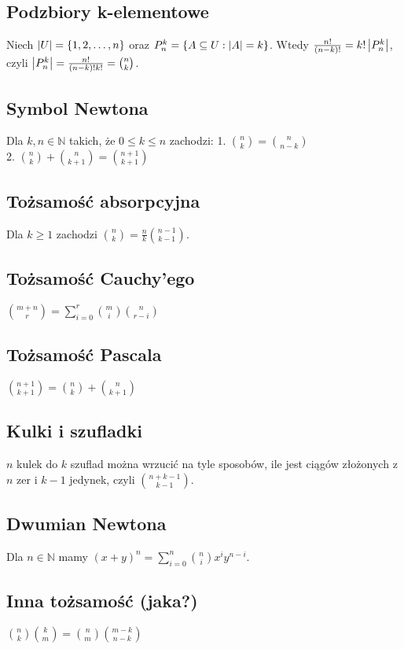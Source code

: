 \subsection*{Podzbiory k-elementowe}
Niech $\left| U \right| = \{ 1, 2, \ldots, n \}$ oraz $P_n^k = {\{ A \subseteq U : \left| A \right| = k \}}$.
Wtedy ${\frac{n!}{(n - k)!}} = {k! \left| P_n^k \right|}$, czyli 
$\left| P_n^k \right| = \frac{n!}{(n - k)! k!} = \binom{n}{k}$.

\subsection*{Symbol Newtona}
Dla $k, n \in \mathbb{N}$ takich, że $0 \leq k \leq n$ zachodzi:
1. $\binom{n}{k} = \binom{n}{n-k}$ \\
2. $\binom{n}{k} + \binom{n}{k+1} = \binom{n+1}{k+1}$

\subsection*{Tożsamość absorpcyjna}
Dla $k \geq 1$ zachodzi $\binom{n}{k} = \frac{n}{k} \binom{n-1}{k-1}$.

\subsection*{Tożsamość Cauchy'ego}
$\binom{m+n}{r} = \sum\limits_{i=0}^{r} \binom{m}{i} \binom{n}{r-i}$

\subsection*{Tożsamość Pascala}
$\binom{n+1}{k+1} = \binom{n}{k} + \binom{n}{k+1}$

\subsection*{Kulki i szufladki}
$n$ kulek do $k$ szuflad można wrzucić na tyle sposobów, ile jest ciągów złożonych
z $n$ zer i $k-1$ jedynek, czyli $\binom{n+k-1}{k-1}$.

\subsection*{Dwumian Newtona}
Dla $n \in \mathbb{N}$ mamy 
$(x+y)^n = \sum\limits_{i=0}^{n} \binom{n}{i} x^i y^{n-i}$.

\subsection*{Inna tożsamość (jaka?)}
$\binom{n}{k} \binom{k}{m} = \binom{n}{m} \binom{m-k}{n-k}$


